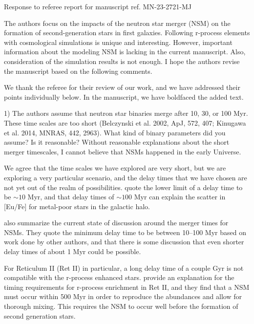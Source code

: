 \documentclass[11pt]{article}
\begin{document}
\begin{center} 
\bfseries{
\begin{large}
  Response to referee report for manuscript ref. MN-23-2721-MJ
\end{large}
}
\end{center}

\begin{tcolorbox}[colback={lightgray}]
    The authors focus on the impacts of the neutron star merger (NSM) on the formation of second-generation stars in first galaxies. Following r-process elements with cosmological simulations is unique and interesting. However, important information about the modeling NSM is lacking in the current manuscript. Also, consideration of the simulation results is not enough. I hope the authors revise the manuscript based on the following comments.
\end{tcolorbox}

We thank the referee for their review of our work, and we have
addressed their points individually below.  In the manuscript, we have
boldfaced the added text.  

\begin{tcolorbox}[colback={lightgray}]
    1)      The authors assume that neutron star binaries merge after 10, 30, or 100 Myr. These time scales are too short (Belczynski et al. 2002, ApJ, 572, 407; Kinugawa et al. 2014, MNRAS, 442, 2963). What kind of binary parameters did you assume? Is it reasonable? Without reasonable explanations about the short merger timescales, I cannot believe that NSMs happened in the early Universe.
\end{tcolorbox}

We agree that the time scales we have explored are very short, but we are exploring a very particular scenario, and the delay times that we have chosen are not yet out of the realm of possibilities. \citet{Hirai15} quote the lower limit of a delay time to be $\sim10$ Myr, and that delay times of $\sim100$ Myr can explain the scatter in [Eu/Fe] for metal-poor stars in the galactic halo. 

\citet{Frebel23} also summarize the current state of discussion around the merger times for NSMs. They quote the minimum delay time to be between 10--100 Myr based on work done by other authors, and that there is some discussion that even shorter delay times of about 1 Myr could be possible.

For Reticulum II (Ret II) in particular, a long delay time of a couple Gyr is not compatible with the r-process enhanced stars. \citet{Simon23} provide an explanation for the timing requirements for r-process enrichment in Ret II, and they find that a NSM must occur within 500 Myr in order to reproduce the abundances and allow for thorough mixing. This requires the NSM to occur well before the formation of second generation stars.
\end{document}
